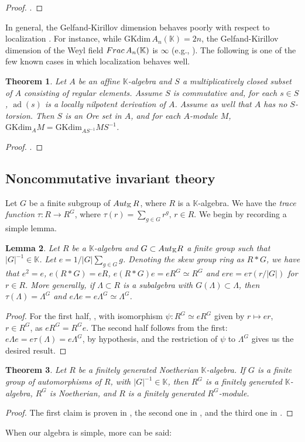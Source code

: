 \documentclass[10pt,a4paper]{amsart}
\newtheorem{theorem}{Theorem}[section]
\newtheorem{lemma}[theorem]{Lemma}
\newcommand{\Weyl}{A_n(\mathbb{K})} %
\newcommand{\GKdim}{\text{GKdim}}    %
\def\k{\mathbb K}
\newcommand{\Frac}{{\rm{Frac}}}
\newcommand{\Autk}{{\rm{Aut}}}
\def\k{\mathbb K}
\def\KK{\mathbb K}
\begin{document}
\begin{proof}
    \cite[Proposition 1.6(d)]{Lorenz0}.
\end{proof}
In general, the Gelfand-Kirillov dimension behaves poorly with respect to localization \cite[Chapter 4]{KL}. For instance, while $\GKdim \, \Weyl=2n$, the Gelfand-Kirillov dimension of the Weyl field $\Frac \, \Weyl$ is $\infty$ (e.g., \cite[Theorem 8.17]{KL}). The following is one of the few known cases in which localization behaves well.
\begin{theorem}\label{basic-GK-2}
    Let $A$ be an affine $\k$-algebra and $S$ a multiplicatively closed subset of $A$ consisting of regular elements. Assume $S$ is commutative and, for each $s \in S$, $\operatorname{ad}(s)$ is a locally nilpotent derivation of $A$. Assume as well that $A$ has no $S$-torsion. Then $S$ is an Ore set in $A$, and for each $A$-module $M$, $\GKdim_A M= \GKdim_{AS^{-1}} MS^{-1}$.
\end{theorem}
\begin{proof}
    \cite[Theorem 3.2]{Lorenz0}.
\end{proof}
\subsection{Noncommutative invariant theory}
Let $G$ be a finite subgroup of $\Autk_\KK \, R$, where $R$ is a $\KK$-algebra. We have the \emph{trace function} $\tau:R\rightarrow R^G$, where $\tau(r)=\sum_{g \in G} r^g, \, r \in R$.
We begin by recording a simple lemma.
\begin{lemma}\label{most-basic-lemma}
Let $R$ be a $\KK$-algebra and $G \subset \Autk_\KK R$ a finite group such that $|G|^{-1} \in \KK$. Let $e=1 /|G| \sum_{g \in G} g$. Denoting the skew group ring as $R*G$, we have that $e^2=e$, $e(R*G)=eR$, $e(R*G)e=eR^G\simeq R^G$ and $ere=e\tau(r/|G|)$ for $r \in R$. More generally, if $\Lambda \subset R$ is a subalgebra with $G(\Lambda) \subset \Lambda$, then $\tau(\Lambda)=\Lambda^G$ and $e \Lambda e=e \Lambda^G \simeq \Lambda^G$.
\end{lemma}
\begin{proof}
    For the first half, \cite[Lemma 2.1 and its proof]{Montgomery}, with isomorphism $\psi: R^G \simeq eR^G$ given by $ r \mapsto er$, $ r \in R^G$, as $eR^G=R^Ge$. The second half follows from the first: $e \Lambda e= e \tau(\Lambda)= e \Lambda^G$, by hypothesis, and the restriction of $\psi$ to $ \Lambda^G$ gives us the desired result.
\end{proof}
\begin{theorem}\label{MS}
Let $R$ be a finitely generated Noetherian $\k$-algebra. If $G$ is a finite group of automorphisms of $R$, with $|G|^{-1} \in \k$, then $R^G$ is a finitely generated $\k$-algebra, $R^G$ is Noetherian, and $R$ is a finitely generated $R^G$-module.
\end{theorem}
\begin{proof}
    The first claim is proven in \cite{MS}, the second one in \cite[Corollary 1.12]{Montgomery}, and the third one in \cite[Corollary 5.9]{Montgomery}.
\end{proof}
When our algebra is simple, more can be said:
\end{document}
